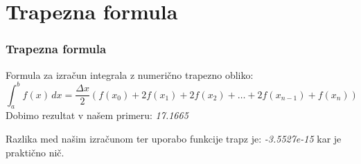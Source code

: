 \documentclass{beamer}
\begin{document}
\section{Trapezna formula}
\begin{frame}
    \frametitle{Trapezna formula}
    Formula za izračun integrala z numerično trapezno obliko:
    \[
    \int_a^b f(x) \, dx = \frac{\Delta x}{2} \left( f(x_0) + 2f(x_1) + 2f(x_2) + \dots + 2f(x_{n-1}) + f(x_n) \right)
    \]
    Dobimo rezultat v našem primeru: \textit{17.1665}
    
    Razlika med našim izračunom ter uporabo funkcije trapz je: \textit{-3.5527e-15} kar je praktično nič.
    
\end{frame}
\end{document}
